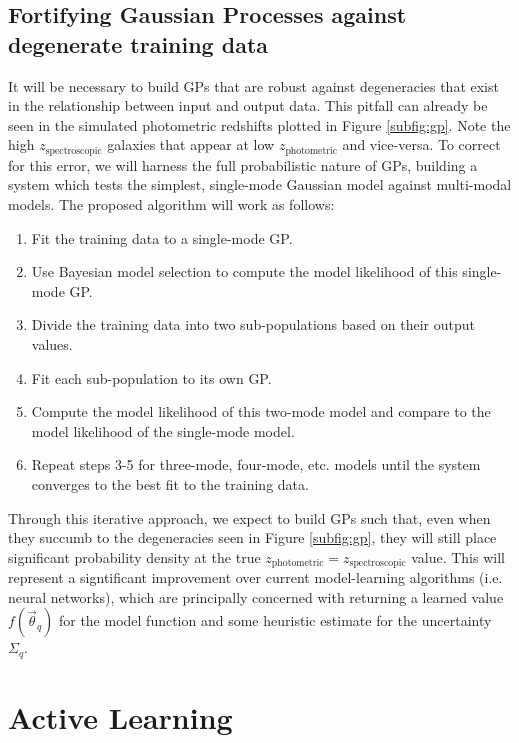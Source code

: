 \documentclass[prd,nofootbib,floatfix,11pt,tightenlines]{revtex4}
\begin{document}
\subsection{Fortifying Gaussian Processes against degenerate training data}
\label{sec:multimode}

It will be necessary to build GPs that are robust against degeneracies
that exist in the relationship between input and output
data.  This pitfall can already be seen in the simulated photometric redshifts
plotted in Figure \ref{subfig:gp}.  Note the high
$z_\text{spectroscopic}$ galaxies that appear at low $z_\text{photometric}$ and
vice-versa.  To correct for this error, we will harness the full probabilistic
nature of GPs, building a system which tests the simplest, single-mode Gaussian
model against multi-modal models.  The proposed algorithm will work as follows:
\begin{enumerate}
\item Fit the training data to a single-mode GP.

\item Use Bayesian model selection \cite{mackay}
to compute the model likelihood of this single-mode GP.

\item Divide the training data into two sub-populations based on their output
values.

\item Fit each sub-population to its own GP.

\item Compute the model likelihood of this two-mode model and compare to the
model likelihood of the single-mode model.

\item Repeat steps 3-5 for three-mode, four-mode, etc. models until
  the system converges to the best fit to the training data.
\end{enumerate}
Through this iterative approach, we expect to build  GPs such that, even when they
succumb to the degeneracies seen in Figure \ref{subfig:gp}, they will still place
significant probability density at the true
$z_\text{photometric}=z_\text{spectroscopic}$ value.  This will represent a
signtificant improvement over current model-learning algorithms (i.e. neural networks), 
which are
principally concerned with returning a learned value $f(\vec{\theta}_q)$ 
for the model function and
some heuristic estimate for the uncertainty $\Sigma_q$.

\section{Active Learning}
\end{document}
